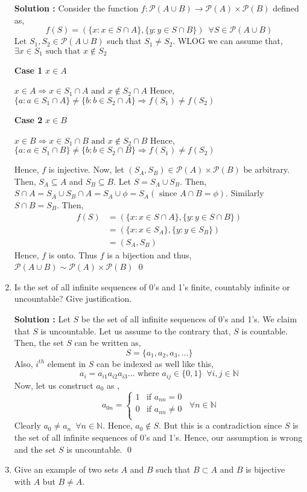 \documentclass[10pt]{article}
\newcommand{\nn}{\mathbb{N}}
\newcommand{\p}{\mathcal{P}}
\begin{document}
\begin{enumerate}
	    \textbf{Solution : }Consider the function $f : \p(A \cup B) \to \p(A) \times \p(B)$ defined as,
	    $$f(S) = (\{ x : x \in S \cap A \},\{ y : y \in S \cap B \}) \,\,\, \forall S \in \p(A \cup B)$$
	    Let $S_1, S_2 \in \p(A \cup B)$ such that $S_1 \neq S_2$. WLOG we can assume that, $\exists x \in S_1 \text{ such that } x \notin S_2$

	    \textbf{Case 1 }$x \in A$ 

    $x \in A \Rightarrow x \in S_1 \cap A \text{ and } x \notin S_2 \cap A$
    Hence, $\{a : a \in S_1 \cap A \} \neq \{ b : b \in S_2 \cap A \} \Rightarrow f(S_1) \neq f(S_2)$

	    \textbf{Case 2 }$x \in B$ 

    $x \in B \Rightarrow x \in S_1 \cap B \text{ and } x \notin S_2 \cap B$
    Hence, $\{a : a \in S_1 \cap B \} \neq \{ b : b \in S_2 \cap B \} \Rightarrow f(S_1) \neq f(S_2)$

    Hence, $f$ is injective. Now, let $(S_A, S_B) \in \p(A) \times \p(B)$ be arbitrary. Then, $S_A \subseteq A$ and $S_B \subseteq B$.
    Let $S = S_A \cup S_B$. Then, $S \cap A = S_A \cup S_B \cap A = S_A \cup \phi = S_A (\text{ since } A \cap B = \phi)$. Similarly $S \cap B = S_B$.
    Then, 
    \begin{align*}
	f(S) &= (\{ x : x \in S \cap A \}, \{ y : y \in S \cap B \}) \\
     	&= (\{x : x \in S_A\}, \{y : y \in S_B\})\\
	&=(S_A, S_B)
    \end{align*}
    Hence, $f$ is onto. Thus $f$ is a bijection and thus, $\p(A \cup B) \sim \p(A) \times \p(B)$ \qed

    \item Is the set of all infinite sequences of 0's and 1's finite, countably infinite or uncountable? Give justification.

    \textbf{Solution : }Let $S$ be the set of all infinite sequences of 0's and 1's. We claim that $S$ is uncountable. Let us assume to the contrary that, $S$ is countable. Then, the set $S$ can be written as, $$S = \{ a_1, a_2, a_3, \dots \}$$ Also, $i^{th}$ element in $S$ can be indexed as well like this, $$a_i = a_{i1} a_{i2} a_{i3} \dots \text{ where } a_{ij} \in \{0, 1\} \,\,\, \forall i,j \in \nn$$ 
    Now, let us construct $a_0$ as ,
    \begin{equation*}
        a_{0n} = 
        \begin{cases}
            1 & \text{if }a_{nn} = 0 \\
            0 & \text{if }a_{nn} \neq 0\\
        \end{cases}
        \,\,\, \forall n \in \nn
    \end{equation*}
    Clearly $a_0 \neq a_n \,\,\, \forall n \in \nn$. Hence, $a_0 \notin S$. But this is a contradiction since $S$ is the set of all infinite sequences of 0's and 1's. Hence, our assumption is wrong and the set $S$ is uncountable. \qed
    \item Give an example of two sets $A$ and $B$ such that $B \subset A$ and $B$ is bijective with $A$ but $B \neq A$.


\end{enumerate}
\end{document}
